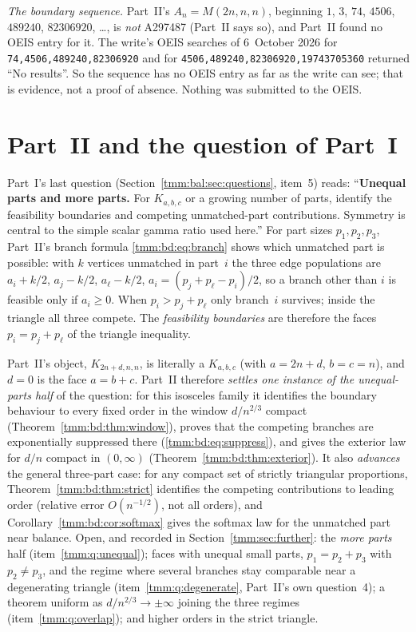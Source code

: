 \documentclass[11pt,letterpaper]{article}
\theoremstyle{remark}\newtheorem{remark}[theorem]{Remark}
\begin{document}
\emph{The boundary sequence.} Part~II's $A_n=M(2n,n,n)$, beginning $1$, $3$, $74$, $4506$, $489240$, $82306920$, \dots, is \emph{not} A297487 (Part~II says so), and Part~II found no OEIS entry for it. The write's OEIS searches of 6~October 2026 for \texttt{74,4506,489240,82306920} and for \texttt{4506,489240,82306920,19743705360} returned ``No results''. So the sequence has no OEIS entry as far as the write can see; that is evidence, not a proof of absence. Nothing was submitted to the OEIS.

\section*{Part~II and the question of Part~I}\label{tmm:sec:sequel}
Part~I's last question (Section~\ref{tmm:bal:sec:questions}, item~5) reads: ``\textbf{Unequal parts and more parts.} For $K_{a,b,c}$ or a growing number of parts, identify the feasibility boundaries and competing unmatched-part contributions. Symmetry is central to the simple scalar gamma ratio used here.'' For part sizes $p_1,p_2,p_3$, Part~II's branch formula \eqref{tmm:bd:eq:branch} shows which unmatched part is possible: with $k$ vertices unmatched in part~$i$ the three edge populations are $a_i+k/2$, $a_j-k/2$, $a_\ell-k/2$, $a_i=(p_j+p_\ell-p_i)/2$, so a branch other than $i$ is feasible only if $a_i\ge0$. When $p_i>p_j+p_\ell$ only branch~$i$ survives; inside the triangle all three compete. The \emph{feasibility boundaries} are therefore the faces $p_i=p_j+p_\ell$ of the triangle inequality.

Part~II's object, $K_{2n+d,n,n}$, is literally a $K_{a,b,c}$ (with $a=2n+d$, $b=c=n$), and $d=0$ is the face $a=b+c$. Part~II therefore \emph{settles one instance of the unequal-parts half} of the question: for this isosceles family it identifies the boundary behaviour to every fixed order in the window $d/n^{2/3}$ compact (Theorem~\ref{tmm:bd:thm:window}), proves that the competing branches are exponentially suppressed there (\eqref{tmm:bd:eq:suppress}), and gives the exterior law for $d/n$ compact in $(0,\infty)$ (Theorem~\ref{tmm:bd:thm:exterior}). It also \emph{advances} the general three-part case: for any compact set of strictly triangular proportions, Theorem~\ref{tmm:bd:thm:strict} identifies the competing contributions to leading order (relative error $O(n^{-1/2})$, not all orders), and Corollary~\ref{tmm:bd:cor:softmax} gives the softmax law for the unmatched part near balance. Open, and recorded in Section~\ref{tmm:sec:further}: the \emph{more parts} half (item~\ref{tmm:q:unequal}); faces with unequal small parts, $p_1=p_2+p_3$ with $p_2\ne p_3$, and the regime where several branches stay comparable near a degenerating triangle (item~\ref{tmm:q:degenerate}, Part~II's own question~4); a theorem uniform as $d/n^{2/3}\to\pm\infty$ joining the three regimes (item~\ref{tmm:q:overlap}); and higher orders in the strict triangle.
\end{document}
